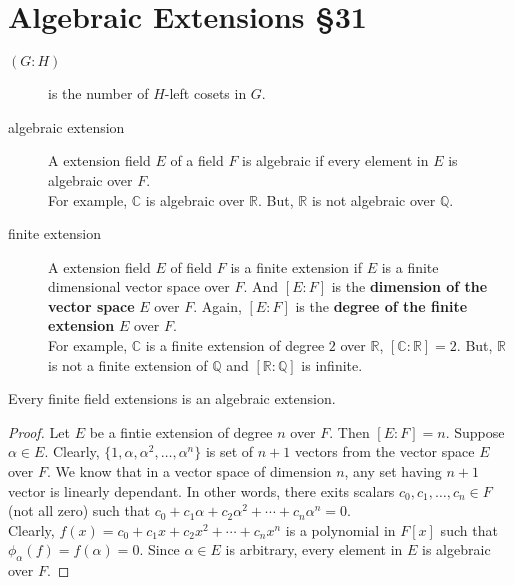 \section{Algebraic Extensions \S31}
\begin{description}
	\item[$(G : H)$] is the number of $H$-left cosets in $G$.
	\item[algebraic extension] A extension field $E$ of a field $F$ is algebraic if every element in $E$ is algebraic over $F$.\\
		For example, $\mathbb{C}$ is algebraic over $\mathbb{R}$.
		But, $\mathbb{R}$ is not algebraic over $\mathbb{Q}$.
	\item[finite extension] A extension field $E$ of field $F$ is a finite extension if $E$ is a finite dimensional vector space over $F$.
		And $[E:F]$ is the \textbf{dimension of the vector space} $E$ over $F$.
		Again, $[E:F]$ is the \textbf{degree of the finite extension} $E$ over $F$.\\
		For example, $\mathbb{C}$ is a finite extension of degree $2$ over $\mathbb{R}$, $[\mathbb{C} : \mathbb{R}] = 2$. But, $\mathbb{R}$ is not a finite extension of $\mathbb{Q}$ and $[\mathbb{R} : \mathbb{Q}]$ is infinite.
\end{description}

\begin{theorem}
	Every finite field extensions is an algebraic extension.
\end{theorem}
\begin{proof}
	Let $E$ be a fintie extension of degree $n$ over $F$.
	Then $[E:F] = n$.
	Suppose $\alpha \in E$.
	Clearly, $\{1,\alpha,\alpha^2,\dots,\alpha^n \}$ is set of $n+1$ vectors from the vector space $E$ over $F$.
	We know that in a vector space of dimension $n$, any set having $n+1$ vector is linearly dependant.
	In other words, there exits scalars $c_0,c_1,\dots,c_n \in F$ (not all zero) such that $c_0+c_1\alpha+c_2\alpha^2+\dotsb+c_n\alpha^n = 0$.\\

	Clearly, $f(x) = c_0 + c_1x + c_2x^2 + \dotsb +c_nx^n$ is a polynomial in $F[x]$ such that $\phi_\alpha(f) = f(\alpha) = 0$.
	Since $\alpha \in E$ is arbitrary, every element in $E$ is algebraic over $F$.
\end{proof}

